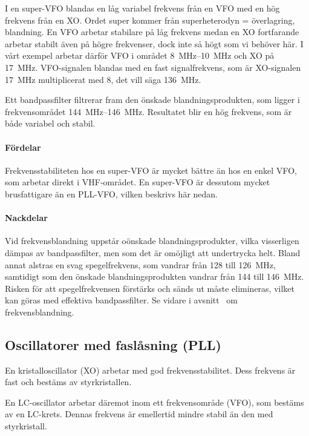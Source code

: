 I en super-VFO blandas en låg variabel frekvens från en VFO med en hög
frekvens från en XO.
Ordet super kommer från superheterodyn = överlagring, blandning.
En VFO arbetar stabilare på låg frekvens medan en XO fortfarande arbetar
stabilt även på högre frekvenser, dock inte så högt som vi behöver här.
I vårt exempel arbetar därför VFO i området \SIrange{8}{10}{\mega\hertz} och XO
på \qty{17}{\mega\hertz}.
VFO-signalen blandas med en fast signalfrekvens, som är XO-signalen
\qty{17}{\mega\hertz} multiplicerat med 8, det vill säga \qty{136}{\mega\hertz}.

Ett bandpassfilter filtrerar fram den önskade blandningsprodukten, som
ligger i frekvensområdet \SIrange{144}{146}{\mega\hertz}.
Resultatet blir en hög frekvens, som är både variabel och stabil.

\paragraph{Fördelar}
Frekvensstabiliteten hos en super-VFO är mycket bättre än hos en enkel VFO,
som arbetar direkt i VHF-området.
En super-VFO är dessutom mycket brusfattigare än en PLL-VFO, vilken
beskrivs här nedan.

\paragraph{Nackdelar}
Vid frekvensblandning uppstår oönskade blandningsprodukter, vilka visserligen
dämpas av bandpassfilter, men som det är omöjligt att undertrycka helt.
Bland annat alstras en svag spegelfrekvens, som vandrar från 128 till
\qty{126}{\mega\hertz}, samtidigt som den önskade blandningsprodukten vandrar
från 144 till \qty{146}{\mega\hertz}.
Risken för att spegelfrekvensen förstärks och sänds ut måste elimineras, vilket
kan göras med effektiva bandpassfilter.
Se vidare i avsnitt~ om frekvensblandning.

\subsection{Oscillatorer med faslåsning (PLL)}
\label{PLL}

En kristalloscillator (XO) arbetar med god frekvensstabilitet.
Dess frekvens är fast och bestäms av styrkristallen.

En LC-oscillator arbetar däremot inom ett frekvensområde (VFO), som bestäms av
en LC-krets.
Dennas frekvens är emellertid mindre stabil än den med styrkristall.

